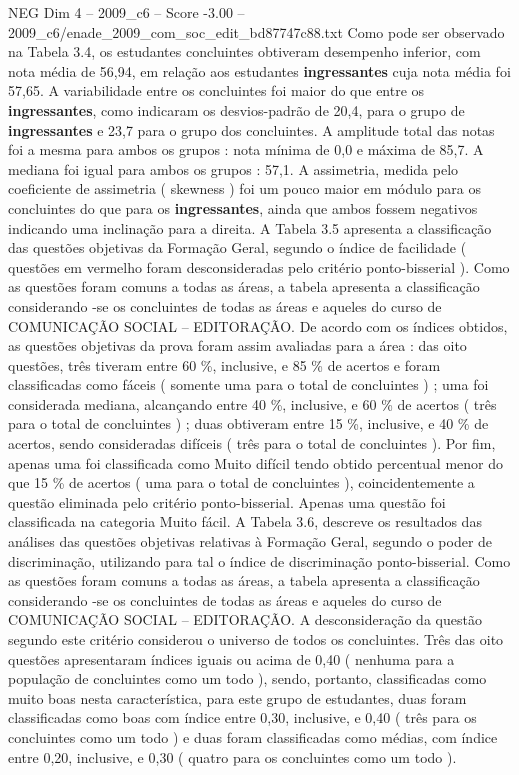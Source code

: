 \begin{textsample}{NEG Dim 4 – 2009\_c6 – Score -3.00 – 2009\_c6/enade\_2009\_com\_soc\_edit\_bd87747c88.txt}
Como pode ser observado na Tabela 3.4, os estudantes concluintes obtiveram desempenho inferior, com nota média de 56,94, em relação aos estudantes \textbf{ingressantes} cuja nota média foi 57,65.
A variabilidade entre os concluintes foi maior do que entre os \textbf{ingressantes}, como indicaram os desvios-padrão de 20,4, para o grupo de \textbf{ingressantes} e 23,7 para o grupo dos concluintes.
A amplitude total das notas foi a mesma para ambos os grupos : nota mínima de 0,0 e máxima de 85,7.
A mediana foi igual para ambos os grupos : 57,1.
A assimetria, medida pelo coeficiente de assimetria ( skewness ) foi um pouco maior em módulo para os concluintes do que para os \textbf{ingressantes}, ainda que ambos fossem negativos indicando uma inclinação para a direita.
A Tabela 3.5 apresenta a classificação das questões objetivas da Formação Geral, segundo o índice de facilidade ( questões em vermelho foram desconsideradas pelo critério ponto-bisserial ).
Como as questões foram comuns a todas as áreas, a tabela apresenta a classificação considerando -se os concluintes de todas as áreas e aqueles do curso de COMUNICAÇÃO SOCIAL – EDITORAÇÃO.
De acordo com os índices obtidos, as questões objetivas da prova foram assim avaliadas para a área : das oito questões, três tiveram entre 60 \%, inclusive, e 85 \% de acertos e foram classificadas como fáceis ( somente uma para o total de concluintes ) ; uma foi considerada mediana, alcançando entre 40 \%, inclusive, e 60 \% de acertos ( três para o total de concluintes ) ; duas obtiveram entre 15 \%, inclusive, e 40 \% de acertos, sendo consideradas difíceis ( três para o total de concluintes ).
Por fim, apenas uma foi classificada como Muito difícil tendo obtido percentual menor do que 15 \% de acertos ( uma para o total de concluintes ), coincidentemente a questão eliminada pelo critério ponto-bisserial.
Apenas uma questão foi classificada na categoria Muito fácil.
A Tabela 3.6, descreve os resultados das análises das questões objetivas relativas à Formação Geral, segundo o poder de discriminação, utilizando para tal o índice de discriminação ponto-bisserial.
Como as questões foram comuns a todas as áreas, a tabela apresenta a classificação considerando -se os concluintes de todas as áreas e aqueles do curso de COMUNICAÇÃO SOCIAL – EDITORAÇÃO.
A desconsideração da questão segundo este critério considerou o universo de todos os concluintes.
Três das oito questões apresentaram índices iguais ou acima de 0,40 ( nenhuma para a população de concluintes como um todo ), sendo, portanto, classificadas como muito boas nesta característica, para este grupo de estudantes, duas foram classificadas como boas com índice entre 0,30, inclusive, e 0,40 ( três para os concluintes como um todo ) e duas foram classificadas como médias, com índice entre 0,20, inclusive, e 0,30 ( quatro para os concluintes como um todo ).

\end{textsample}
